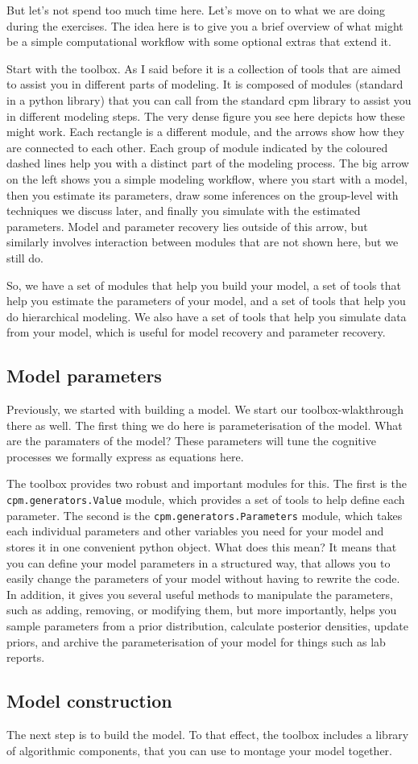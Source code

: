 \documentclass[12pt]{article}
\begin{document}
But let's not spend too much time here. Let's move on to what we are doing during the exercises. The idea here is to give you a brief overview of what might be a simple computational workflow with some optional extras that extend it.

Start with the toolbox. As I said before it is a collection of tools that are aimed to assist you in different parts of modeling.  It is composed of modules (standard in a python library) that you can call from the standard cpm library to assist you in different modeling steps. The very dense figure you see here depicts how these might work. Each rectangle is a different module, and the arrows show how they are connected to each other. Each group of module indicated by the coloured dashed lines help you with a distinct part of the modeling process. The big arrow on the left shows you a simple modeling workflow, where you start with a model, then you estimate its parameters, draw some inferences on the group-level with techniques we discuss later, and finally you simulate with the estimated parameters. Model and parameter recovery lies outside of this arrow, but similarly involves interaction between modules that are not shown here, but we still do.

So, we have a set of modules that help you build your model, a set of tools that help  you estimate the parameters of your model, and a set of tools that help you do hierarchical modeling. We also have a set of tools that help you simulate data from your model, which is useful for model recovery and parameter recovery.

\subsection{Model parameters}

Previously, we started with building a model. We start our toolbox-wlakthrough there as well. The first thing we do here is parameterisation of the model. What are the paramaters of the model? These parameters will tune the cognitive processes we formally express as equations here.

The toolbox provides two robust and important modules for this. The first is the \texttt{cpm.generators.Value} module, which provides a set of tools to help define each parameter. The second is the \texttt{cpm.generators.Parameters} module, which takes each individual parameters and other variables you need for your model and stores it in one convenient python object. What does this mean? It means that you can define your model parameters in a structured way, that allows you to easily change the parameters of your model without having to rewrite the code. In addition, it gives you several useful methods to manipulate the parameters, such as adding, removing, or modifying them, but more importantly, helps you sample parameters from a prior distribution, calculate posterior densities, update priors, and archive the parameterisation of your model for things such as lab reports.

\subsection{Model construction}

The next step is to build the model. To that effect, the toolbox includes a library of algorithmic components, that you can use to montage your model together.
\end{document}
